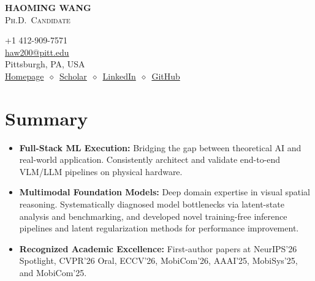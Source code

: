 \documentclass[11pt, letterpaper]{article}
\begin{document}
\noindent
\begin{minipage}[t]{0.58\linewidth}
  \vspace{0pt}
  {\fontsize{24pt}{26pt}\selectfont \textbf{HAOMING WANG}}\\[2pt]
  {\scshape\normalsize Ph.D.\ Candidate}
\end{minipage}%
\begin{minipage}[t]{0.42\linewidth}
  \vspace{0pt}
  \raggedleft\small
  +1 412-909-7571 \\
  \href{mailto:haw200@pitt.edu}{haw200@pitt.edu} \\
  Pittsburgh, PA, USA \\[2pt]
  \href{https://haomingwang645.github.io/}{Homepage}\ $\diamond$\ \href{https://scholar.google.com.hk/citations?user=bf6LCjUAAAAJ}{Scholar}\ $\diamond$\ \href{https://www.linkedin.com/in/haoming-wang-40a6a7239/}{LinkedIn}\ $\diamond$\ \href{https://github.com/HaomingWang645}{GitHub}
\end{minipage}

\section{Summary}
\begin{itemize}[leftmargin=1.1em, itemsep=2pt, topsep=2pt]
  \item \textbf{Full-Stack ML Execution:} Bridging the gap between theoretical AI and real-world application. Consistently architect and validate end-to-end VLM/LLM pipelines on physical hardware.
  \item \textbf{Multimodal Foundation Models:} Deep domain expertise in visual spatial reasoning. Systematically diagnosed model bottlenecks via latent-state analysis and benchmarking, and developed novel training-free inference pipelines and latent regularization methods for performance improvement.
  \item \textbf{Recognized Academic Excellence:} First-author papers at NeurIPS'26 Spotlight, CVPR'26 Oral, ECCV'26, MobiCom'26, AAAI'25, MobiSys'25, and MobiCom'25.
\end{itemize}

\end{document}
